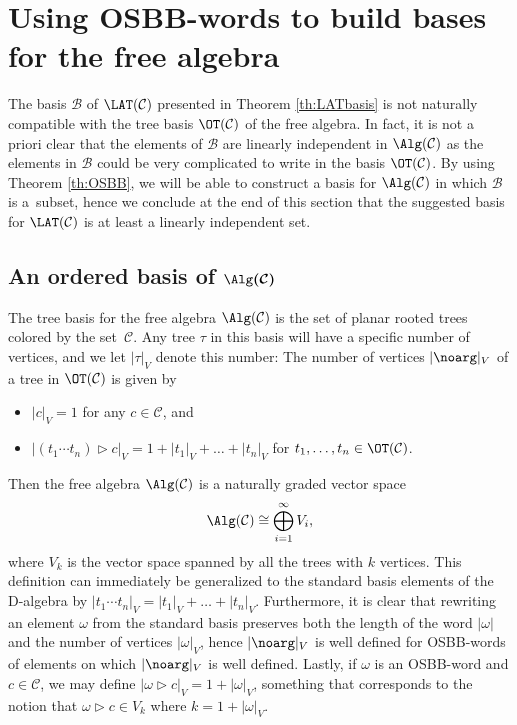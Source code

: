 \documentclass[pdftex]{sigma}
\numberwithin{equation}{section}
\begin{document}
\section{Using OSBB-words to build bases for the free algebra}\label{sec:bases}

The basis $\mathcal{B}$ of $\LAT(\mathcal{C})$ presented in Theorem \ref{th:LATbasis} is not naturally compatible with the tree basis $\OT(\mathcal{C})$ of the free algebra. In fact, it is not a priori clear that the elements of $\mathcal{B}$ are linearly independent in $\Alg(\mathcal{C})$ as the elements in $\mathcal{B}$ could be very complicated to write in the basis $\OT(\mathcal{C})$. By using Theorem \ref{th:OSBB}, we will be able to construct a basis for $\Alg(\mathcal{C})$ in which $\mathcal{B}$ is a~subset, hence we conclude at the end of this section that the suggested basis for $\LAT(\mathcal{C})$ is at least a linearly independent set.

\subsection[An ordered basis of Alg(C)]{An ordered basis of $\boldsymbol{\Alg(\mathcal{C})}$}%


The tree basis for the free algebra $\Alg(\mathcal{C})$ is the set of planar rooted trees colored by the set~$\mathcal{C}$. Any tree $\tau$ in this basis will have a specific number of vertices, and we let $|\tau|_V$ denote this number: The number of vertices $| \noarg |_V$ of a tree in $\OT(\mathcal{C})$ is given by
\begin{itemize}\itemsep=0pt
 \item $|c|_V=1$ for any $c \in \mathcal{C}$, and
 \item $|(t_1 \cdots t_n) \rhd c|_V = 1 + |t_1|_V + \dots + |t_n|_V$ for $t_1 , \dots , t_n \in \OT(\mathcal{C})$.
\end{itemize}


Then the free algebra $\Alg(\mathcal{C})$ is a naturally graded vector space
\[
\Alg(\mathcal{C}) \cong \bigoplus_{i=1}^{\infty} V_i,
\]
where $V_k$ is the vector space spanned by all the trees with $k$ vertices. This definition can immediately be generalized to the standard basis elements of the D-algebra by $|t_1 \cdots t_n|_V = |t_1|_V + \dots + |t_n|_V$. Furthermore, it is clear that rewriting an element $\omega$ from the standard basis preserves both the length of the word $|\omega|$ and the number of vertices $|\omega|_V$, hence $|\noarg|_V$ is well defined for OSBB-words of elements on which $|\noarg|_V$ is well defined. Lastly, if $\omega$ is an OSBB-word and $c \in \mathcal{C}$, we may define $|\omega \rhd c|_V = 1+|\omega|_V$, something that corresponds to the notion that $\omega \rhd c \in V_k$ where $k = 1+ |\omega|_V$.
\end{document}
